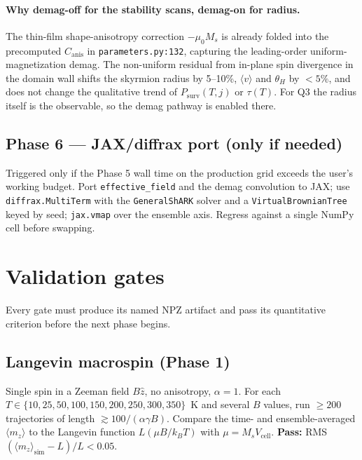 \documentclass[11pt,a4paper]{article}
\newcommand{\Ms}{M_s}
\newcommand{\Vcell}{V_{\text{cell}}}
\newcommand{\jcur}{j}
\newcommand{\kB}{k_B}
\begin{document}
\paragraph{Why demag-off for the stability scans, demag-on for
radius.} The thin-film shape-anisotropy correction $-\mu_0 \Ms$ is
already folded into the precomputed $C_{\text{anis}}$ in
\texttt{parameters.py:132}, capturing the leading-order
uniform-magnetization demag. The non-uniform residual from
in-plane spin divergence in the domain wall shifts the skyrmion
radius by 5--10\%, $\langle v \rangle$ and $\theta_H$ by $<5\%$,
and does not change the qualitative trend of $P_{\text{surv}}(T,
\jcur)$ or $\tau(T)$. For Q3 the radius itself is the observable,
so the demag pathway is enabled there.

\subsection{Phase 6 --- JAX/diffrax port (only if needed)}

Triggered only if the Phase 5 wall time on the production grid
exceeds the user's working budget. Port \texttt{effective\_field}
and the demag convolution to JAX; use \texttt{diffrax.MultiTerm}
with the \texttt{GeneralShARK} solver and a
\texttt{VirtualBrownianTree} keyed by seed; \texttt{jax.vmap} over
the ensemble axis. Regress against a single NumPy cell before
swapping.

\section{Validation gates}\label{sec:val}

Every gate must produce its named NPZ artifact and pass its
quantitative criterion before the next phase begins.

\subsection{Langevin macrospin (Phase 1)}

Single spin in a Zeeman field $B \hat{z}$, no anisotropy, $\alpha=1$.
For each $T \in \{10, 25, 50, 100, 150, 200, 250, 300, 350\}$~K
and several $B$ values, run $\geq 200$ trajectories of length
$\gtrsim 100 / (\alpha \gamma B)$. Compare the time- and
ensemble-averaged $\langle m_z \rangle$ to the Langevin function
$L(\mu B / \kB T)$ with $\mu = \Ms \Vcell$.
\textbf{Pass:} RMS$(\langle m_z\rangle_{\text{sim}} - L)/L < 0.05$.
\end{document}
